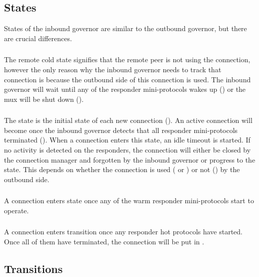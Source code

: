 \subsection{States}

States of the inbound governor are similar to the outbound governor, but there
are crucial differences.

\subsubsection{\RemoteCold}
The remote cold state signifies that the remote peer is not using the
connection, however the only reason why the inbound governor needs to track
that connection is because the outbound side of this connection is used.  The
inbound governor will wait until any of the responder mini-protocols wakes up
(\AwakeRemote{}) or the mux will be shut down (\MuxTerminated{}).

\subsubsection{\RemoteIdle}
The \RemoteIdle{} state is the initial state of each new connection
(\NewConnection{}).  An active connection will become \RemoteIdle{} once the
inbound governor detects that all responder mini-protocols terminated
(\WaitIdleRemote{}).  When a connection enters this state, an idle timeout is
started.  If no activity is detected on the responders, the connection will
either be closed by the connection manager and forgotten by the inbound
governor or progress to the \RemoteCold{} state.  This depends on whether the
connection is used (\warm{} or \hot{}) or not (\cold{}) by the outbound side.

\subsubsection{\RemoteWarm}
A connection enters \RemoteWarm{} state once any of the warm responder mini-protocols start
to operate.

\subsubsection{\RemoteHot}
A connection enters \RemoteHot{} transition once any responder hot protocols have started.
Once all of them have terminated, the connection will be put in \RemoteWarm{}.

\subsection{Transitions}

